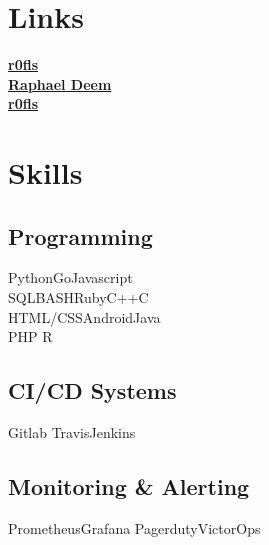 \documentclass[]{deemweaver}
\begin{document}
%
%
\lastupdated

%
%


%
%

\begin{minipage}[t]{0.32\textwidth}


\section{Links}
{\FA \faGithub} \href{https://github.com/r0fls}{\bf r0fls} \\
{\FA \faLinkedin} \href{https://www.linkedin.com/in/raphael-deem-5757ba31}{\bf Raphael Deem} \\
{\FA \faStackOverflow}  \href{http://stackoverflow.com/users/1318734/rofls}{\bf r0fls} \\


\section{Skills}
\subsection{Programming}
Python\textbullet{}Go\textbullet{}Javascript\\
SQL\textbullet{}BASH\textbullet{}Ruby\textbullet{}C++\textbullet{}C\\
HTML/CSS\textbullet{}Android\textbullet{}Java\\
PHP \textbullet{}R
\sectionsep
\subsection{CI/CD Systems}
{}Gitlab \textbullet{} Travis\textbullet{}Jenkins
\sectionsep
\subsection{Monitoring \& Alerting}
Prometheus\textbullet{}Grafana
Pagerduty\textbullet{}VictorOps
\sectionsep

\end{minipage}
\end{document}
